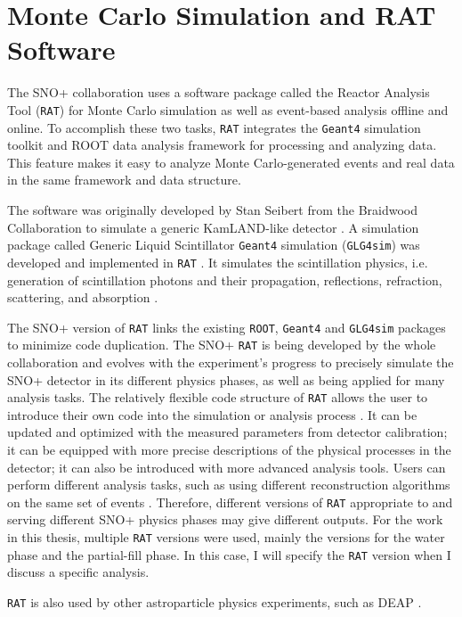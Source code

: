 \section{Monte Carlo Simulation and RAT Software}\label{sect:rat}

The SNO+ collaboration uses a software package called the Reactor Analysis Tool (\texttt{RAT}) for Monte Carlo simulation as well as event-based analysis offline and online. To accomplish these two tasks, \texttt{RAT} integrates the \texttt{Geant4} simulation toolkit \cite{agostinelli2003geant4} and ROOT data analysis framework \cite{brunroot} for processing and analyzing data. This feature makes it easy to analyze Monte Carlo-generated events and real data in the same framework and data structure.

The software was originally developed by Stan Seibert from the Braidwood Collaboration to simulate a generic KamLAND-like detector \cite{ratManual}. A simulation package called Generic Liquid Scintillator \texttt{Geant4} simulation (\texttt{GLG4sim}) was developed and implemented in \texttt{RAT} \cite{horton2006introduction}. It simulates the scintillation physics, i.e. generation of scintillation photons and their propagation, reflections, refraction, scattering, and absorption \cite{dunger2018topological}.

The SNO+ version of \texttt{RAT} links the existing \texttt{ROOT}, \texttt{Geant4} and \texttt{GLG4sim} packages to minimize code duplication. The SNO+ \texttt{RAT} is being developed by the whole collaboration and evolves with the experiment's progress to precisely simulate the SNO+ detector in its different physics phases, as well as being applied for many analysis tasks. The relatively flexible code structure of \texttt{RAT} allows the user to introduce their own code into the simulation or analysis process \cite{ratManual}. It can be updated and optimized with the measured parameters from detector calibration; it can be equipped with more precise descriptions of the physical processes in the detector; it can also be introduced with more advanced analysis tools. Users can perform different analysis tasks, such as using different reconstruction algorithms on the same set of events \cite{ratManual}. Therefore, different versions of \texttt{RAT} appropriate to and serving different SNO+ physics phases may give different outputs. For the work in this thesis, multiple \texttt{RAT} versions were used, mainly the versions for the water phase and the partial-fill phase. In this case, I will specify the \texttt{RAT} version when I discuss a specific analysis.

\texttt{RAT} is also used by other astroparticle physics experiments, such as DEAP \cite{caldwell2014simulation}.
